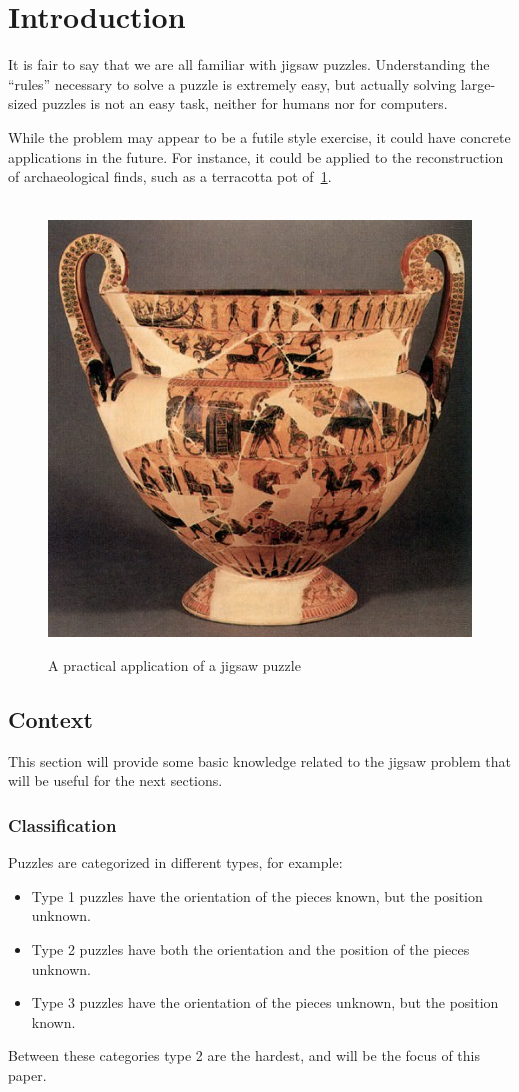 \documentclass{article}
\begin{document}
\section{Introduction}
It is fair to say that we are all familiar with jigsaw puzzles.
Understanding the ``rules'' necessary to solve a puzzle is
extremely easy, but actually solving large-sized puzzles
is not an easy task, neither for humans nor for computers.

While the problem may appear to be a futile style exercise,
it could have concrete applications in the future. For instance,
it could be applied to the reconstruction of archaeological finds,
such as a terracotta pot of~\cref{fig:pot}.

\begin{figure}[h]
  \caption{A practical application of a jigsaw puzzle}~\label{fig:pot}
  \includegraphics[height=0.25\textwidth]{pictures/terracotta_pot.jpg}
  \centering
\end{figure}


\subsection{Context}
This section will provide some basic knowledge
related to the jigsaw problem that will be useful
  for the next sections.
\subsubsection{Classification}
Puzzles are categorized in different types, for example:
\begin{itemize}
  \item Type 1 puzzles have the orientation of the pieces known, but the position unknown. 
  \item Type 2 puzzles have both the orientation and the position of the pieces unknown.
  \item Type 3 puzzles have the orientation of the pieces unknown, but the position known.
\end{itemize}
Between these categories type 2 are the hardest, and will be the focus of this paper.
\end{document}
